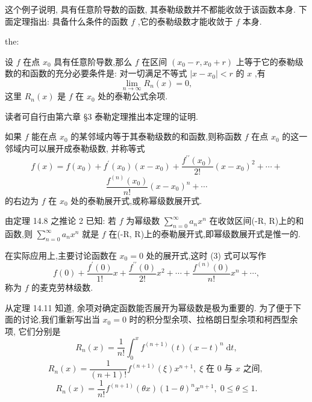 这个例子说明, 具有任意阶导数的函数, 其泰勒级数并不都能收敛于该函数本身. 下面定理指出: 具备什么条件的函数 \(f\) ,它的泰勒级数才能收敛于 \(f\) 本身.

\begin{theorem}{}{the:}

\end{theorem}
 设 \(f\) 在点 \({x}_{0}\) 具有任意阶导数,那么 \(f\) 在区间 \(\left( {{x}_{0} - r,{x}_{0} + r}\right)\) 上等于它的泰勒级数的和函数的充分必要条件是: 对一切满足不等式 \(\left| {x - {x}_{0}}\right|  < r\) 的 \(x\) ,有
\[
\mathop{\lim }\limits_{{n \rightarrow  \infty }}{R}_{n}\left( x\right)  = 0,
\]
这里 \({R}_{n}\left( x\right)\) 是 \(f\) 在 \({x}_{0}\) 处的泰勒公式余项.

读者可自行由第六章 §3 泰勒定理推出本定理的证明.

如果 \(f\) 能在点 \({x}_{0}\) 的某邻域内等于其泰勒级数的和函数,则称函数 \(f\) 在点 \({x}_{0}\) 的这一邻域内可以展开成泰勒级数, 并称等式
\[
f\left( x\right)  = f\left( {x}_{0}\right)  + {f}^{\prime }\left( {x}_{0}\right) \left( {x - {x}_{0}}\right)  + \frac{{f}^{\prime \prime }\left( {x}_{0}\right) }{2!}{\left( x - {x}_{0}\right) }^{2} + \cdots  +
\]
\[
\frac{{f}^{\left( n\right) }\left( {x}_{0}\right) }{n!}{\left( x - {x}_{0}\right) }^{n} + \cdots  \tag{4}
\]
的右边为 \(f\) 在 \({x}_{0}\) 处的泰勒展开式,或称幂级数展开式.

由定理 14.8 之推论 2 已知: 若 \(f\) 为幂级数 \(\mathop{\sum }\limits_{{n = 0}}^{\infty }{a}_{n}{x}^{n}\) 在收敛区间(-R, R)上的和函数,则 \(\mathop{\sum }\limits_{{n = 0}}^{\infty }{a}_{n}{x}^{n}\) 就是 \(f\) 在(-R, R)上的泰勒展开式,即幂级数展开式是惟一的.

在实际应用上,主要讨论函数在 \({x}_{0} = 0\) 处的展开式,这时 (3) 式可以写作
\[
f\left( 0\right)  + \frac{{f}^{\prime }\left( 0\right) }{1!}x + \frac{{f}^{\prime \prime }\left( 0\right) }{2!}{x}^{2} + \cdots  + \frac{{f}^{\left( n\right) }\left( 0\right) }{n!}{x}^{n} + \cdots ,
\]
称为 \(f\) 的麦克劳林级数.

从定理 14.11 知道, 余项对确定函数能否展开为幂级数是极为重要的. 为了便于下面的讨论,我们重新写出当 \({x}_{0} = 0\) 时的积分型余项、拉格朗日型余项和柯西型余项, 它们分别是
\[
{R}_{n}\left( x\right)  = \frac{1}{n!}{\int }_{0}^{x}{f}^{\left( n + 1\right) }\left( t\right) {\left( x - t\right) }^{n}\mathrm{\;d}t,
\]
\[
{R}_{n}\left( x\right)  = \frac{1}{\left( {n + 1}\right) !}{f}^{\left( n + 1\right) }\left( \xi \right) {x}^{n + 1},\;\xi \text{ 在 }0\text{ 与 }x\text{ 之间, }
\]
\[
{R}_{n}\left( x\right)  = \frac{1}{n!}{f}^{\left( n + 1\right) }\left( {\theta x}\right) {\left( 1 - \theta \right) }^{n}{x}^{n + 1},\;0 \leq  \theta  \leq  1.
\]
